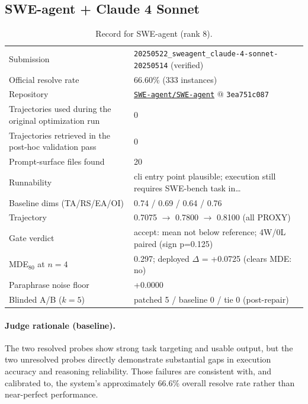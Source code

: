 \subsection{SWE-agent + Claude 4 Sonnet}
\label{app:agent8}
\begin{table}[H]\centering\scriptsize
\caption{Record for SWE-agent (rank 8).}
\begin{tabular}{lp{8.2cm}}\toprule
Submission & \texttt{20250522\_\allowbreak{}sweagent\_\allowbreak{}claude-4-sonnet-20250514} (verified) \\
Official resolve rate & 66.60\% (333 instances) \\
Repository & \href{https://github.com/SWE-agent/SWE-agent}{\texttt{SWE-agent/SWE-agent}} @ \texttt{3ea751c087} \\
Trajectories used during the original optimization run & 0 \\
Trajectories retrieved in the post-hoc validation pass & 0 \\
Prompt-surface files found & 20 \\
Runnability & cli entry point plausible; execution still requires SWE-bench task in\ldots{} \\
Baseline dims (TA/RS/EA/OI) & 0.74 / 0.69 / 0.64 / 0.76 \\
Trajectory & 0.7075 $\to$ 0.7800 $\to$ 0.8100 (all PROXY) \\
Gate verdict & accept: mean not below reference; 4W/0L paired (sign p=0.125) \\
MDE$_{80}$ at $n{=}4$ & 0.297; deployed $\Delta$ = +0.0725 (clears MDE: no) \\
Paraphrase noise floor & +0.0000 \\
Blinded A/B ($k{=}5$) & patched 5 / baseline 0 / tie 0 (post-repair) \\
\bottomrule\end{tabular}\end{table}
\paragraph{Judge rationale (baseline).}
The two resolved probes show strong task targeting and usable output, but the two unresolved probes directly demonstrate substantial gaps in execution accuracy and reasoning reliability. Those failures are consistent with, and calibrated to, the system's approximately 66.6\% overall resolve rate rather than near-perfect performance.
